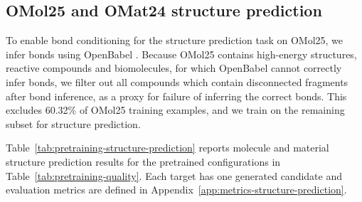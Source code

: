\documentclass{article} %
\begin{document}
\subsection{OMol25 and OMat24 structure prediction}
\label{app:pretraining-structure-prediction}

To enable bond conditioning for the structure prediction task on OMol25, we infer bonds using OpenBabel \citep{oboyle2011openbabel}. Because OMol25 contains high-energy structures, reactive compounds and biomolecules, for which OpenBabel cannot correctly infer bonds, we filter out all compounds which contain disconnected fragments after bond inference, as a proxy for failure of inferring the correct bonds. This excludes 60.32\% of OMol25 training examples, and we train on the remaining subset for structure prediction. 

Table~\ref{tab:pretraining-structure-prediction} reports molecule and material structure prediction results for the pretrained configurations in Table~\ref{tab:pretraining-quality}. Each target has one generated candidate and evaluation metrics are defined in Appendix~\ref{app:metrics-structure-prediction}.
\end{document}
